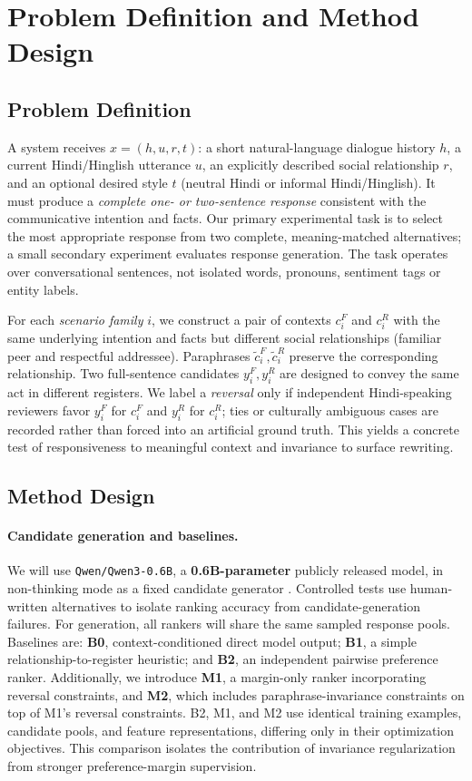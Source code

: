 \documentclass[11pt]{article}
\begin{document}
\section{Problem Definition and Method Design}
\subsection{Problem Definition}
A system receives $x=(h,u,r,t)$: a short natural-language dialogue history $h$, a current Hindi/Hinglish utterance $u$, an explicitly described social relationship $r$, and an optional desired style $t$ (neutral Hindi or informal Hindi/Hinglish). It must produce a \emph{complete one- or two-sentence response} consistent with the communicative intention and facts. Our primary experimental task is to select the most appropriate response from two complete, meaning-matched alternatives; a small secondary experiment evaluates response generation. The task operates over conversational sentences, not isolated words, pronouns, sentiment tags or entity labels.

For each \emph{scenario family} $i$, we construct a pair of contexts $c_i^{F}$ and $c_i^{R}$ with the same underlying intention and facts but different social relationships (familiar peer and respectful addressee). Paraphrases $\tilde c_i^F,\tilde c_i^R$ preserve the corresponding relationship. Two full-sentence candidates $y_i^F,y_i^R$ are designed to convey the same act in different registers. We label a \emph{reversal} only if independent Hindi-speaking reviewers favor $y_i^F$ for $c_i^F$ and $y_i^R$ for $c_i^R$; ties or culturally ambiguous cases are recorded rather than forced into an artificial ground truth. This yields a concrete test of responsiveness to meaningful context and invariance to surface rewriting.

\subsection{Method Design}
\paragraph{Candidate generation and baselines.}
We will use \texttt{Qwen/Qwen3-0.6B}, a \textbf{0.6B-parameter} publicly released model, in non-thinking mode as a fixed candidate generator \citep{qwen306}. Controlled tests use human-written alternatives to isolate ranking accuracy from candidate-generation failures. For generation, all rankers will share the same sampled response pools. Baselines are: \textbf{B0}, context-conditioned direct model output; \textbf{B1}, a simple relationship-to-register heuristic; and \textbf{B2}, an independent pairwise preference ranker. Additionally, we introduce \textbf{M1}, a margin-only ranker incorporating reversal constraints, and \textbf{M2}, which includes paraphrase-invariance constraints on top of M1's reversal constraints. B2, M1, and M2 use identical training examples, candidate pools, and feature representations, differing only in their optimization objectives. This comparison isolates the contribution of invariance regularization from stronger preference-margin supervision.
\end{document}
